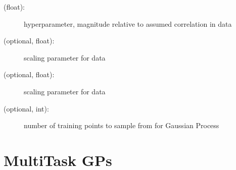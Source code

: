 \documentclass[letterpaper,10pt,english,openany,oneside]{sphinxmanual}
\begin{document}
\begin{fulllineitems}
\begin{description}
\begin{description}
\item[{ (float):}] \leavevmode
hyperparameter, magnitude relative to assumed correlation in  data

\item[{ (optional, float):}] \leavevmode
scaling parameter for  data

\item[{ (optional, float):}] \leavevmode
scaling parameter for  data

\item[{ (optional, int):}] \leavevmode
number of training points to sample from for Gaussian Process

\end{description}

\end{description}

\end{fulllineitems}



\section{MultiTask GPs}
\label{\detokenize{gp:multitask-gps}}
\end{document}
